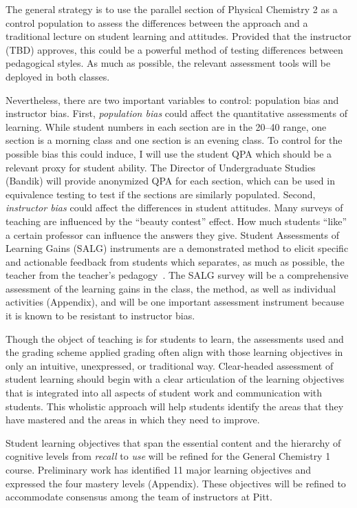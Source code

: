 \documentclass[10pt,letterpaper]{article}
\begin{document}
{The general strategy is to use the parallel section of Physical Chemistry 2 as a control population to assess the differences between the \pogil approach and a traditional lecture on student learning and attitudes. Provided that the instructor (TBD) approves, this could be a powerful method of testing differences between pedagogical styles. As much as possible, the relevant assessment tools will be deployed in both classes. 

Nevertheless, there are two important variables to control: population bias and instructor bias. First, \textit{population bias} could affect the quantitative assessments of learning. While student numbers in each section are in the 20--40 range, one section is a morning class and one section is an evening class. To control for the possible bias this could induce, I will use the student QPA which should be a relevant proxy for student ability. The Director of Undergraduate Studies (Bandik) will provide anonymized QPA for each section, which can be used in equivalence testing to test if the sections are similarly populated. Second, \textit{instructor bias} could affect the differences in student attitudes. Many surveys of teaching are influenced by the ``beauty contest'' effect. How much students ``like'' a certain professor can influence the answers they give. Student Assessments of Learning Gains (SALG) instruments are a demonstrated method to elicit specific and actionable feedback from students which separates, as much as possible, the teacher from the teacher's pedagogy~\cite{Seymour2000}. The SALG survey will be a comprehensive assessment of the learning gains in the class, the \pogil method, as well as individual activities (Appendix), and will be one important assessment instrument because it is known to be resistant to instructor bias.
}%

%
%
Though the object of teaching is for students to learn,  the assessments used and the grading scheme applied grading often align with those learning objectives in only an intuitive, unexpressed, or traditional way. Clear-headed assessment of student learning should begin with a clear articulation of the learning objectives that is integrated into all aspects of student work and communication with students. This wholistic approach will help students identify the areas that they have mastered and the areas in which  they need to improve.

Student learning objectives that span the essential content and the hierarchy of cognitive levels from \textit{recall} to \textit{use} will be refined for the General Chemistry 1 course. Preliminary work has identified 11 major learning objectives and expressed the four mastery levels (Appendix). These objectives will be refined to accommodate consensus among the team of \pogil instructors at Pitt. 
\end{document}
